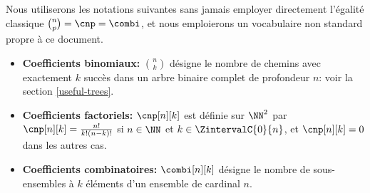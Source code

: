 Nous utiliserons les notations suivantes sans jamais employer directement l'égalité classique $\binom{n}{p} = \cnp = \combi$,
et nous emploierons un vocabulaire non standard propre à ce document.
%
\begin{itemize}
	\item \textbf{Coefficients binomiaux:}
    $\binom{n}{k}$ désigne le nombre de chemins avec exactement $k$ succès dans un arbre binaire complet de profondeur $n$: voir la section  \ref{useful-trees}.


	\item \textbf{Coefficients factoriels:}
    $\cnp[n][k]$ est définie sur $\NN^2$ par
	$\cnp[n][k] = \frac{n!}{k!(n-k)!}$ si $n \in \NN$ et $k \in \ZintervalC{0}{n}$,
	et
	$\cnp[n][k] = 0$ dans les autres cas.


	\item \textbf{Coefficients combinatoires:}
    $\combi[n][k]$ désigne le nombre de sous-ensembles à $k$ éléments d'un ensemble de cardinal $n$.
\end{itemize}